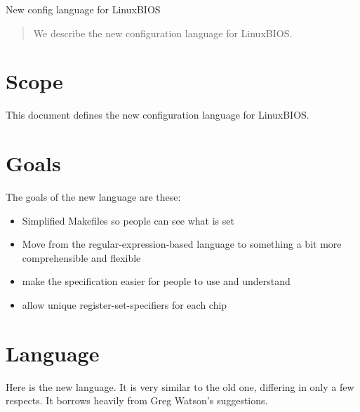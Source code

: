		New config language for LinuxBIOS

\begin{abstract}
We describe the new configuration language for LinuxBIOS.
\end{abstract}

\section{Scope}
This document defines the new configuration language for LinuxBIOS.

\section{Goals}
The goals of the new language are these: 
\begin{itemize}
\item Simplified Makefiles so people can see what is set
\item Move from the regular-expression-based language to something
a bit more comprehensible and flexible
\item make the specification easier for people to use and understand
\item allow unique register-set-specifiers for each chip
\end{itemize}

\section{Language}
Here is the new language. It is very similar to the old one, differing
in only a few respects. It borrows heavily from Greg Watson's suggestions. 


